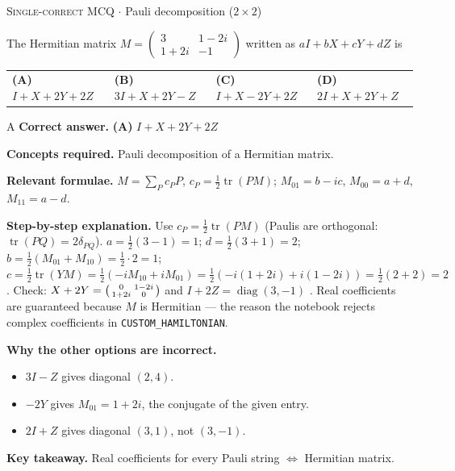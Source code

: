 \documentclass[11pt,a4paper]{article}
\newcommand{\optlabel}[1]{\textbf{(#1)}}
\newcommand{\correctlabel}[1]{\textcolor{okgreen}{\textbf{(#1)}\,\ding{51}}}
\newenvironment{qitem}[1]{\begin{list}{}{\setlength{\leftmargin}{3.3em}\setlength{\labelwidth}{3.1em}%
  \setlength{\labelsep}{0.2em}\setlength{\topsep}{3pt}\setlength{\parsep}{3pt}}\item[\textbf{Q.#1}\hfill]}{\end{list}}
\newcommand{\qsep}{\par\vspace{2pt}{\color{black!15}\hrule}\vspace{4pt}}
\newcommand{\qmeta}[2]{{\footnotesize\color{black!60}\textsc{#1} \;$\cdot$\; #2}\par}
\begin{document}
\begin{qitem}{16}
\qmeta{Single-correct MCQ}{Pauli decomposition ($2\times2$)}
The Hermitian matrix $M = \begin{pmatrix}3 & 1 - 2i\\ 1 + 2i & -1\end{pmatrix}$ written as $aI + bX + cY + dZ$ is
\par\smallskip\noindent\begin{tabularx}{\linewidth}{@{}*{4}{L}@{}}
\correctlabel{A}\,$I + X + 2Y + 2Z$ & \optlabel{B}\,$3I + X + 2Y - Z$ & \optlabel{C}\,$I + X - 2Y + 2Z$ & \optlabel{D}\,$2I + X + 2Y + Z$
\end{tabularx}
\end{qitem}
\begin{solbox}{A}
\textbf{\color{brand}Correct answer.} \textcolor{okgreen}{\textbf{(A)}} $I + X + 2Y + 2Z$

\textbf{\color{brand}Concepts required.} Pauli decomposition of a Hermitian matrix.

\textbf{\color{brand}Relevant formulae.} $M = \sum_P c_PP$, $c_P = \frac12\operatorname{tr}(PM)$; $M_{01} = b - ic$, $M_{00} = a + d$, $M_{11} = a - d$.

\textbf{\color{brand}Step-by-step explanation.} Use $c_P = \tfrac12\operatorname{tr}(PM)$ (Paulis are orthogonal: $\operatorname{tr}(PQ) = 2\delta_{PQ}$).
$a = \tfrac12(3 - 1) = 1$; $d = \tfrac12(3 + 1) = 2$; $b = \tfrac12(M_{01} + M_{10}) = \tfrac12\cdot2 = 1$; $c = \tfrac12\operatorname{tr}(YM) = \tfrac12(-iM_{10} + iM_{01}) = \tfrac12(-i(1 + 2i) + i(1 - 2i)) = \tfrac12(2 + 2) = 2$.
Check: $X + 2Y = \begin{psmallmatrix}0 & 1 - 2i\\ 1 + 2i & 0\end{psmallmatrix}$ \checkmark{} and $I + 2Z = \operatorname{diag}(3, -1)$ \checkmark{}. Real coefficients are guaranteed because $M$ is Hermitian --- the
reason the notebook rejects complex coefficients in \texttt{CUSTOM\_HAMILTONIAN}.

\textbf{\color{brand}Why the other options are incorrect.}
\begin{itemize}[leftmargin=2.4em, itemsep=1pt, topsep=2pt]
\item[\textbf{(B)}] $3I - Z$ gives diagonal $(2, 4)$.
\item[\textbf{(C)}] $-2Y$ gives $M_{01} = 1 + 2i$, the conjugate of the given entry.
\item[\textbf{(D)}] $2I + Z$ gives diagonal $(3, 1)$, not $(3, -1)$.
\end{itemize}
\textbf{\color{brand}Key takeaway.} Real coefficients for every Pauli string $\iff$ Hermitian matrix.
\end{solbox}
\qsep
\end{document}
